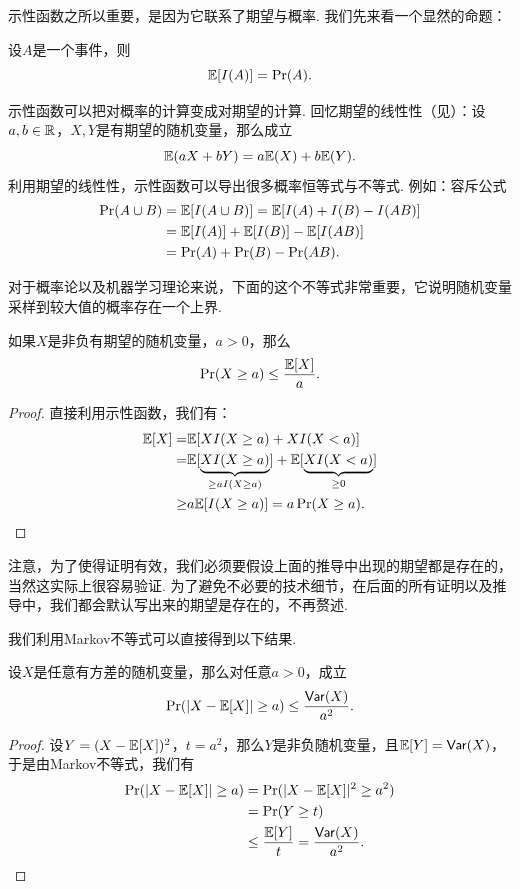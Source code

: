 示性函数之所以重要，是因为它联系了期望与概率. 我们先来看一个显然的命题：
\begin{proposition}\label{prop:expectation-of-indicator-function}
    设$A$是一个事件，则
    \[
        \mathbb{E}[I(A)] = \Pr(A).
    \]
\end{proposition}

示性函数可以把对概率的计算变成对期望的计算. 回忆期望的线性性（见）：设$a,b\in\mathbb{R}$，$X,Y$是有期望的随机变量，那么成立
\[\mathbb{E}(aX+bY)=a\mathbb{E}(X)+b\mathbb{E}(Y).\]
利用期望的线性性，示性函数可以导出很多概率恒等式与不等式. 例如：容斥公式
\begin{align*}
    \Pr(A\cup B) &= \mathbb{E}[I(A\cup B)] = \mathbb{E}[I(A) + I(B) - I(AB)] \\
    &= \mathbb{E}[I(A)] +  \mathbb{E}[I(B)] -  \mathbb{E}[I(AB)]\\
    &= \Pr(A) + \Pr(B) - \Pr(AB).
\end{align*}

对于概率论以及机器学习理论来说，下面的这个不等式非常重要，它说明随机变量采样到较大值的概率存在一个上界.

\begin{theorem}[Markov不等式]\label{thm:markov-inequality}
    如果$X$是非负有期望的随机变量，$a>0$，那么
        \[
            \Pr(X\geq a) \leq \frac{\mathbb{E}[X]}{a}.
        \]
\end{theorem}

\begin{proof}
直接利用示性函数，我们有：
    \begin{align*}
        \mathbb{E}[X] = &\mathbb{E}[X I(X\geq a)+X I(X<a)]\\
        =&\mathbb{E}[\underbrace{X I(X\geq a)}_{\geq aI(X\geq a)}]+\mathbb{E}[\underbrace{XI(X<a)}_{\geq 0}]\\
        \geq& a\mathbb{E}[I(X\geq a)]=a\Pr(X\geq a).
    \end{align*}
\end{proof}

注意，为了使得证明有效，我们必须要假设上面的推导中出现的期望都是存在的，当然这实际上很容易验证. 为了避免不必要的技术细节，在后面的所有证明以及推导中，我们都会默认写出来的期望是存在的，不再赘述. 

我们利用Markov不等式可以直接得到以下结果. 
\begin{corollary}[Chebyshev不等式]\label{cor:chebyshev-inequality}
设$X$是任意有方差的随机变量，那么对任意$a>0$，成立
    \[
        \Pr(|X - \mathbb{E}[X]| \geq a) \leq \frac{\mathsf{Var}(X)}{a^2}.
    \]
\end{corollary}
\begin{proof}
设$Y=(X-\mathbb{E}[X])^2$，$t=a^2$，那么$Y$是非负随机变量，且$\mathbb{E}[Y]=\mathsf{Var}(X)$，于是由Markov不等式，我们有
\begin{align*}
    \Pr(|X - \mathbb{E}[X]| \geq a) &= \Pr(|X - \mathbb{E}[X]|^2 \geq a^2) \\
    &=\Pr(Y \geq t) \\
    &\leq \frac{\mathbb{E}[Y]}{t}=\frac{\mathsf{Var}(X)}{a^2}.
\end{align*}
\end{proof}

